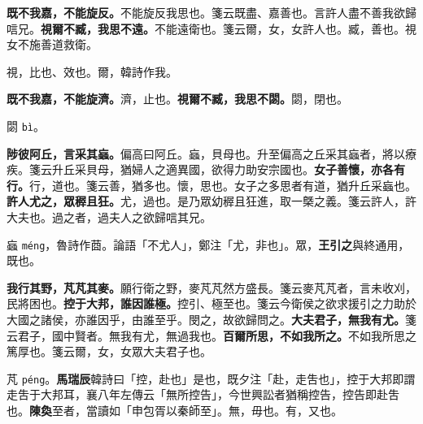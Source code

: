 \textbf{既不我嘉，不能旋反。}{\footnotesize 不能旋反我思也。箋云既盡、嘉善也。言許人盡不善我欲歸唁兄。}\textbf{視爾不臧，我思不遠。}{\footnotesize 不能遠衛也。箋云爾，女，女許人也。臧，善也。視女不施善道救衛。}

\begin{quoting}視，比也、效也。爾，韓詩作我。\end{quoting}

\textbf{既不我嘉，不能旋濟。}{\footnotesize 濟，止也。}\textbf{視爾不臧，我思不閟。}{\footnotesize 閟，閉也。}

\begin{quoting}閟 \texttt{bì}。\end{quoting}

\textbf{陟彼阿丘，言采其蝱。}{\footnotesize 偏高曰阿丘。蝱，貝母也。升至偏高之丘采其蝱者，將以療疾。箋云升丘采貝母，猶婦人之適異國，欲得力助安宗國也。}\textbf{女子善懷，亦各有行。}{\footnotesize 行，道也。箋云善，猶多也。懷，思也。女子之多思者有道，猶升丘采蝱也。}\textbf{許人尤之，眾稺且狂。}{\footnotesize 尤，過也。是乃眾幼稺且狂進，取一槩之義。箋云許人，許大夫也。過之者，過夫人之欲歸唁其兄。}

\begin{quoting}蝱 \texttt{méng}，魯詩作莔。論語「不尤人」，鄭注「尤，非也」。眾，\textbf{王引之}與終通用，既也。\end{quoting}

\textbf{我行其野，芃芃其麥。}{\footnotesize 願行衛之野，麥芃芃然方盛長。箋云麥芃芃者，言未收刈，民將困也。}\textbf{控于大邦，誰因誰極。}{\footnotesize 控引、極至也。箋云今衛侯之欲求援引之力助於大國之諸侯，亦誰因乎，由誰至乎。閔之，故欲歸問之。}\textbf{大夫君子，無我有尤。}{\footnotesize 箋云君子，國中賢者。無我有尤，無過我也。}\textbf{百爾所思，不如我所之。}{\footnotesize 不如我所思之篤厚也。箋云爾，女，女眾大夫君子也。}

\begin{quoting}芃 \texttt{péng}。\textbf{馬瑞辰}韓詩曰「控，赴也」是也，既夕注「赴，走吿也」，控于大邦即謂走吿于大邦耳，襄八年左傳云「無所控告」，今世興訟者猶稱控告，控告即赴吿也。\textbf{陳奐}至者，當讀如「申包胥以秦師至」。無，毋也。有，又也。\end{quoting}

